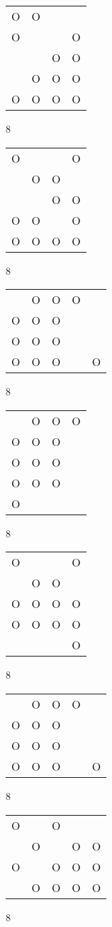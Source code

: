 \begin{tabular}{|m{0.2cm}m{0.2cm}m{0.2cm}m{0.2cm}|}\hline
O&O& & \\
O& & &O\\
 & &O&O\\
 &O&O&O\\
O&O&O&O\\
\hline\end{tabular}8
\begin{tabular}{|m{0.2cm}m{0.2cm}m{0.2cm}m{0.2cm}|}\hline
O& & &O\\
 &O&O& \\
 & &O&O\\
O&O& &O\\
O&O&O&O\\
\hline\end{tabular}8
\begin{tabular}{|m{0.2cm}m{0.2cm}m{0.2cm}m{0.2cm}m{0.2cm}|}\hline
 &O&O&O& \\
O&O&O& & \\
O&O&O& & \\
O&O&O& &O\\
\hline\end{tabular}8
\begin{tabular}{|m{0.2cm}m{0.2cm}m{0.2cm}m{0.2cm}|}\hline
 &O&O&O\\
O&O&O& \\
O&O&O& \\
O&O&O& \\
O& & & \\
\hline\end{tabular}8
\begin{tabular}{|m{0.2cm}m{0.2cm}m{0.2cm}m{0.2cm}|}\hline
O& & &O\\
 &O&O& \\
O&O&O&O\\
O&O&O&O\\
 & & &O\\
\hline\end{tabular}8
\begin{tabular}{|m{0.2cm}m{0.2cm}m{0.2cm}m{0.2cm}m{0.2cm}|}\hline
 &O&O&O& \\
O&O&O& & \\
O&O&O& & \\
O&O&O& &O\\
\hline\end{tabular}8
\begin{tabular}{|m{0.2cm}m{0.2cm}m{0.2cm}m{0.2cm}m{0.2cm}|}\hline
O& &O& & \\
 &O& &O&O\\
O& &O&O&O\\
 &O&O&O&O\\
\hline\end{tabular}8
